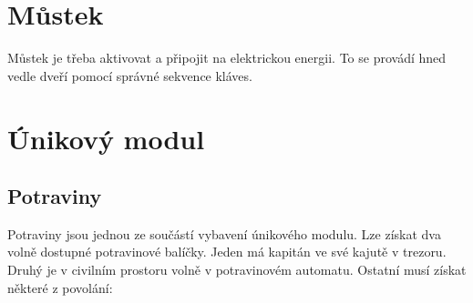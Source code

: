\documentclass[11pt,oneside,a4paper]{article}
\begin{document}
\section{\texorpdfstring{Můstek}{Mustek}}
\label{sec:mustek}
Můstek je třeba aktivovat a připojit na elektrickou energii. To se provádí hned vedle dveří pomocí správné sekvence kláves.

\section{\texorpdfstring{Únikový modul}{Unikovy modul}}
\label{sec:unikovy_modul}
\subsection{\texorpdfstring{Potraviny}{Potraviny}}
\label{subsec:potraviny}
Potraviny jsou jednou ze součástí vybavení únikového modulu. Lze získat dva volně dostupné potravinové balíčky. Jeden má kapitán ve své kajutě v trezoru. Druhý je v civilním prostoru volně v potravinovém automatu. Ostatní musí získat některé z povolání:
\end{document}

